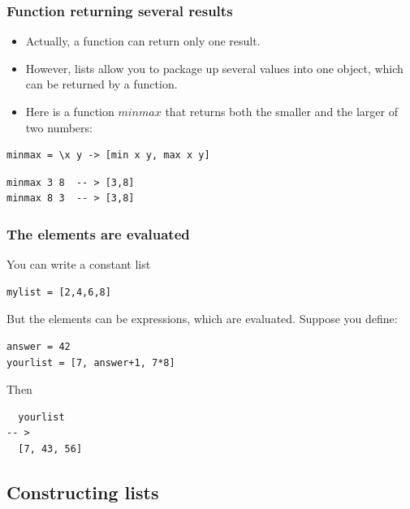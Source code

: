 \documentclass{beamer}
\begin{document}
\begin{frame}[fragile]
\frametitle{Function returning several results}

\begin{itemize}
\item Actually, a function can return only one result.
\item However, lists allow you to package up several values into
  one object, which can be returned by a function.
\item Here is a function $minmax$ that returns both the smaller and
  the larger of two numbers:
\end{itemize}

\begin{verbatim}
minmax = \x y -> [min x y, max x y]
\end{verbatim}

\begin{verbatim}
minmax 3 8  -- > [3,8]
minmax 8 3  -- > [3,8]
\end{verbatim}

\end{frame}


\begin{frame}[fragile]
\frametitle{The elements are evaluated}

You can write a constant list

\begin{verbatim}
mylist = [2,4,6,8]
\end{verbatim}

But the elements can be expressions, which are evaluated.  Suppose
you define:

\begin{verbatim}
answer = 42
yourlist = [7, answer+1, 7*8]
\end{verbatim}

Then

\begin{verbatim}
  yourlist
-- >
  [7, 43, 56]
\end{verbatim}

\end{frame}
\subsection{Constructing lists}
\end{document}
